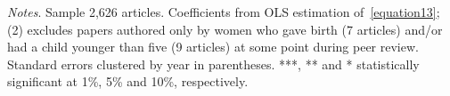\begin{table}[H]
\begin{adjustwidth}{-0.085cm}{}
\begin{threeparttable}
\begin{tabular}{p{2.64cm}SSSSSSS}
            \bottomrule
        \end{tabular}
        \begin{tablenotes}
            \tiny
            \item \textit{Notes}. Sample 2,626 articles. Coefficients from OLS estimation of~\autoref{equation13}; (2) excludes papers authored only by women who gave birth (7 articles) and/or had a child younger than five (9 articles) at some point during peer review. Standard errors clustered by year in parentheses. ***, ** and * statistically significant at 1\%, 5\% and 10\%, respectively.
        \end{tablenotes}
    \end{threeparttable}
    \end{adjustwidth}
\end{table}